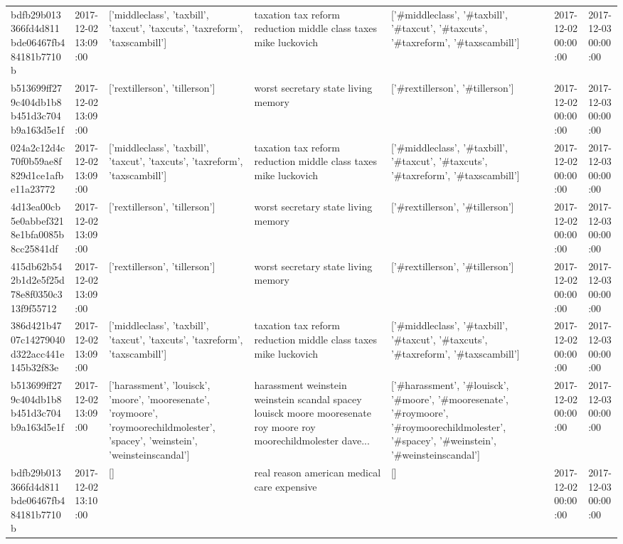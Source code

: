 \begin{tabular}{lllllll}
bdfb29b013366fd4d811bde06467fb484181b7710b & 2017-12-02 13:09:00 & ['middleclass', 'taxbill', 'taxcut', 'taxcuts', 'taxreform', 'taxscambill'] & taxation tax reform reduction middle class taxes mike luckovich & ['#middleclass', '#taxbill', '#taxcut', '#taxcuts', '#taxreform', '#taxscambill'] & 2017-12-02 00:00:00 & 2017-12-03 00:00:00 \\
b513699ff279c404db1b8b451d3c704b9a163d5e1f & 2017-12-02 13:09:00 & ['rextillerson', 'tillerson'] & worst secretary state living memory & ['#rextillerson', '#tillerson'] & 2017-12-02 00:00:00 & 2017-12-03 00:00:00 \\
024a2c12d4c70f0b59ae8f829d1ce1afbe11a23772 & 2017-12-02 13:09:00 & ['middleclass', 'taxbill', 'taxcut', 'taxcuts', 'taxreform', 'taxscambill'] & taxation tax reform reduction middle class taxes mike luckovich & ['#middleclass', '#taxbill', '#taxcut', '#taxcuts', '#taxreform', '#taxscambill'] & 2017-12-02 00:00:00 & 2017-12-03 00:00:00 \\
4d13ea00cb5e0abbef3218e1bfa0085b8cc25841df & 2017-12-02 13:09:00 & ['rextillerson', 'tillerson'] & worst secretary state living memory & ['#rextillerson', '#tillerson'] & 2017-12-02 00:00:00 & 2017-12-03 00:00:00 \\
415db62b542b1d2e5f25d78e8f0350c313f9f55712 & 2017-12-02 13:09:00 & ['rextillerson', 'tillerson'] & worst secretary state living memory & ['#rextillerson', '#tillerson'] & 2017-12-02 00:00:00 & 2017-12-03 00:00:00 \\
386d421b4707c14279040d322acc441e145b32f83e & 2017-12-02 13:09:00 & ['middleclass', 'taxbill', 'taxcut', 'taxcuts', 'taxreform', 'taxscambill'] & taxation tax reform reduction middle class taxes mike luckovich & ['#middleclass', '#taxbill', '#taxcut', '#taxcuts', '#taxreform', '#taxscambill'] & 2017-12-02 00:00:00 & 2017-12-03 00:00:00 \\
b513699ff279c404db1b8b451d3c704b9a163d5e1f & 2017-12-02 13:09:00 & ['harassment', 'louisck', 'moore', 'mooresenate', 'roymoore', 'roymoorechildmolester', 'spacey', 'weinstein', 'weinsteinscandal'] & harassment weinstein weinstein scandal spacey louisck moore mooresenate roy moore roy moorechildmolester dave... & ['#harassment', '#louisck', '#moore', '#mooresenate', '#roymoore', '#roymoorechildmolester', '#spacey', '#weinstein', '#weinsteinscandal'] & 2017-12-02 00:00:00 & 2017-12-03 00:00:00 \\
bdfb29b013366fd4d811bde06467fb484181b7710b & 2017-12-02 13:10:00 & [] & real reason american medical care expensive & [] & 2017-12-02 00:00:00 & 2017-12-03 00:00:00 \\

\end{tabular}
